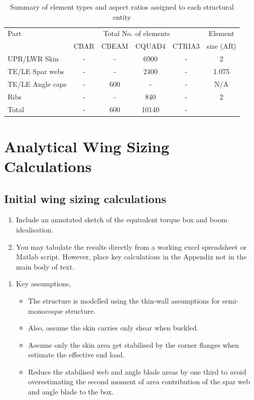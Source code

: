 \documentclass[11pt,a4paper,oneside]{memoir}
\begin{document}
\begin{table}[h]
\centering

\caption{Summary of element types and aspect ratios assigned to each structural entity}
\label{tab:summary-mesh}	
\begin{tabular}{lccccc}
\toprule
Part               & \multicolumn{4}{c}{Total No. of elements}   & Element      \\
\cmidrule{2-5}     &  CBAR & CBEAM  & CQUAD4  & CTRIA3           &   size (AR)  \\
\midrule
UPR/LWR Skin       &   -    &  -      & 6900        &  -                &       2       \\
TE/LE Spar webs    &    -   &   -     &  2400       &     -             &        1.075      \\
TE/LE Angle caps   &  -     &   600     &    -     &    -              &        N/A      \\
Ribs               &   -    &     -   &  840       &        -          &           2   \\
\midrule
Total              &    -   &    600    &     10140    &       -           &              \\
\bottomrule
\end{tabular}
\end{table}

\chapter{Analytical Wing Sizing Calculations}\label{chap:hand-calcs}
\section{Initial wing sizing calculations}
\begin{enumerate}
	\item Include an annotated sketch of the equivalent torque box and boom idealisation.
	\item You may tabulate the results directly from a working excel spreadsheet or Matlab script. However, place key calculations in the Appendix not in the main body of text. 
\end{enumerate}

\begin{enumerate}
    \item Key assumptions,
    \begin{itemize}
        \item The structure is modelled using the thin-wall assumptions for semi-monocoque structure.
        \item Also, assume the skin carries only shear when buckled.
        \item  Assume only the skin area get stabilised by the corner flanges when estimate the effective end load.
        \item Reduce the stabilised web and angle blade areas by one third to avoid overestimating the second moment of area contribution of the spar web and angle blade to the box.
    \end{itemize}
\end{enumerate}
\end{document}

